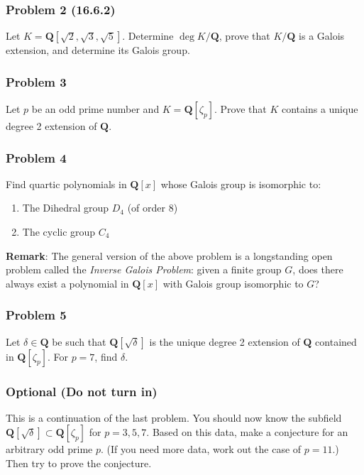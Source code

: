 \documentclass[11pt]{article}
\begin{document}
\subsubsection{Problem 2 (16.6.2)}
\label{sec:org0b11ec3}

Let \(K = \mathbf{Q}[\sqrt 2, \sqrt 3, \sqrt 5]\).
Determine \(\deg K / \mathbf{Q}\), prove that \(K/ \mathbf{Q}\) is a Galois extension, and determine its Galois group.
\subsubsection{Problem 3}
\label{sec:orgad1e3dc}

Let \(p\) be an odd prime number and \(K = \mathbf{Q}[\zeta_{p}]\).
Prove that \(K\) contains a unique degree 2 extension of \(\mathbf{Q}\).
\subsubsection{Problem 4}
\label{sec:org41cffef}

Find quartic polynomials in \(\mathbf{Q}[x]\) whose Galois group is isomorphic to:
\begin{enumerate}
\item The Dihedral group \(D_4\) (of order 8)
\item The cyclic group \(C_4\)
\end{enumerate}

\textbf{Remark}: The general version of the above problem is a longstanding open problem called the \emph{Inverse Galois Problem}: given a finite group \(G\), does there always exist a polynomial in \(\mathbf{Q}[x]\) with Galois group isomorphic to \(G\)?
\subsubsection{Problem 5}
\label{sec:org5556876}

Let \(\delta \in \mathbf{Q}\) be such that \(\mathbf{Q}[\sqrt \delta]\) is the unique degree 2 extension of \(\mathbf{Q}\) contained in \(\mathbf{Q}[\zeta_{p}]\).
For \(p = 7\), find \(\delta\).
\subsubsection{Optional (Do not turn in)}
\label{sec:orgc3a2a43}

This is a continuation of the last problem.
You should now know the subfield \(\mathbf{Q}[\sqrt \delta] \subset \mathbf{Q}[\zeta_p]\) for \(p = 3, 5, 7\).
Based on this data, make a conjecture for an arbitrary odd prime \(p\).
(If you need more data, work out the case of \(p = 11\).)
Then try to prove the conjecture.
\end{document}
